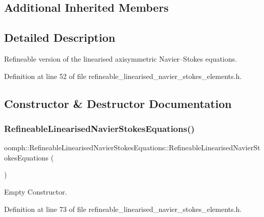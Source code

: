 \subsection*{Additional Inherited Members}


\subsection{Detailed Description}
Refineable version of the linearised axisymmetric Navier--Stokes equations. 

Definition at line 52 of file refineable\+\_\+linearised\+\_\+navier\+\_\+stokes\+\_\+elements.\+h.



\subsection{Constructor \& Destructor Documentation}
\mbox{\label{classoomph_1_1RefineableLinearisedNavierStokesEquations_aff7f2c3b664951a440739d813460ee76}} 
\subsubsection{\texorpdfstring{Refineable\+Linearised\+Navier\+Stokes\+Equations()}{RefineableLinearisedNavierStokesEquations()}}
{\footnotesize\ttfamily oomph\+::\+Refineable\+Linearised\+Navier\+Stokes\+Equations\+::\+Refineable\+Linearised\+Navier\+Stokes\+Equations (\begin{DoxyParamCaption}{ }\end{DoxyParamCaption})\hspace{0.3cm}{\ttfamily [inline]}}



Empty Constructor. 



Definition at line 73 of file refineable\+\_\+linearised\+\_\+navier\+\_\+stokes\+\_\+elements.\+h.



